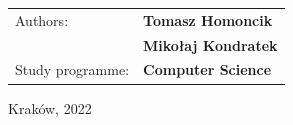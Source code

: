 \begin{titlepage}
    \bigskip
    \bigskip

    \renewcommand{\arraystretch}{0.85}
    \begin{tabularx}{0.7\textwidth}{
        >{\raggedright\arraybackslash}X
        >{\raggedright\arraybackslash}X }
        Authors: & \textbf{Tomasz Homoncik}\\
        & \textbf{Mikołaj Kondratek}\\

        Study programme: & \textbf{Computer Science} \\
    \end{tabularx}

    \vfill

    \begin{center}
        \normalsize{Kraków, 2022}
    \end{center}

\end{titlepage}
